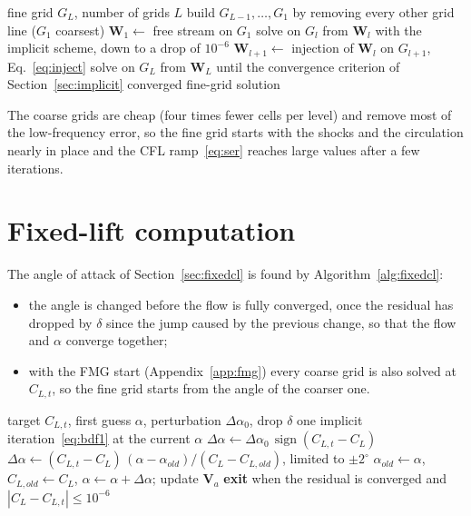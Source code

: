 \documentclass[12pt,a4paper]{article}
\begin{document}
\begin{algorithm}[H]
  \caption{Full-multigrid start}
  \label{alg:fmg}
  \begin{algorithmic}[1]
    \REQUIRE fine grid $G_L$, number of grids $L$
    \STATE build $G_{L-1},\dots,G_1$ by removing every other grid line ($G_1$ coarsest)
    \STATE $\mathbf{W}_1\gets$ free stream on $G_1$
      \STATE solve on $G_l$ from $\mathbf{W}_l$ with the implicit scheme, down to a drop of $10^{-6}$
      \STATE $\mathbf{W}_{l+1}\gets$ injection of $\mathbf{W}_l$ on $G_{l+1}$, Eq.~\eqref{eq:inject}
    \ENDFOR
    \STATE solve on $G_L$ from $\mathbf{W}_L$ until the convergence criterion of Section~\ref{sec:implicit}
    \ENSURE converged fine-grid solution
  \end{algorithmic}
\end{algorithm}

The coarse grids are cheap (four times fewer cells per level) and remove most of the
low-frequency error, so the fine grid starts with the shocks and the circulation nearly in place
and the CFL ramp~\eqref{eq:ser} reaches large values after a few iterations.

\clearpage
\section{Fixed-lift computation}\label{app:fixedcl}

The angle of attack of Section~\ref{sec:fixedcl} is found by Algorithm~\ref{alg:fixedcl}:
\begin{itemize}
  \item the angle is changed before the flow is fully converged, once the residual has dropped by
  $\delta$ since the jump caused by the previous change, so that the flow and $\alpha$ converge
  together;
  \item with the FMG start (Appendix~\ref{app:fmg}) every coarse grid is also solved at $C_{L,t}$,
  so the fine grid starts from the angle of the coarser one.
\end{itemize}

\begin{algorithm}[H]
  \caption{Fixed-lift computation}
  \label{alg:fixedcl}
  \begin{algorithmic}[1]
    \REQUIRE target $C_{L,t}$, first guess $\alpha$, perturbation $\Delta\alpha_0$, drop $\delta$
    \LOOP
      \STATE one implicit iteration~\eqref{eq:bdf1} at the current $\alpha$
          \STATE $\Delta\alpha\gets\Delta\alpha_0\,\operatorname{sign}(C_{L,t}-C_L)$
        \ELSE
          \STATE $\Delta\alpha\gets(C_{L,t}-C_L)\,(\alpha-\alpha_{old})/(C_L-C_{L,old})$, limited to $\pm2^\circ$
        \ENDIF
        \STATE $\alpha_{old}\gets\alpha$, $C_{L,old}\gets C_L$, $\alpha\gets\alpha+\Delta\alpha$; update $\mathbf{V}_a$
      \ENDIF
      \STATE \textbf{exit} when the residual is converged and $|C_L-C_{L,t}|\le10^{-6}$
    \ENDLOOP
  \end{algorithmic}
\end{algorithm}
\end{document}
